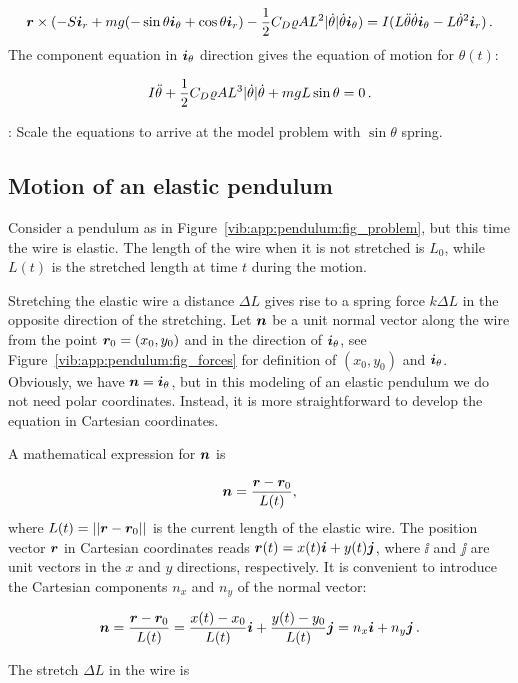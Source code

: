 \documentclass[%
oneside,                 %
final,                   %
10pt]{article}
\newcommand{\shortinlinecomment}[3]{{\color{red}{\bf #1}: #2}}
\begin{document}
\[ \rpos\times(-S\ir + mg(-\sin\theta\ith + \cos\theta\ir) -
\frac{1}{2}C_D\varrho AL^2|\dot\theta|\dot\theta\ith)
= I(L\ddot\theta\dot\theta\ith - L\dot\theta^2\ir)\tp\]
The component equation in $\ith$ direction gives the equation of motion
for $\theta(t)$:

\begin{equation}
I\ddot\theta + \frac{1}{2}C_D\varrho AL^3|\dot\theta|\dot\theta
+ mgL\sin\theta = 0\tp
\label{vib:app:pendulum:thetaeq_physical}
\end{equation}

\shortinlinecomment{hpl 11}{ Scale the equations to arrive at the model problem with $\sin\theta$ spring. }{ Scale the equations to }

\subsection{Motion of an elastic pendulum}
\label{vib:app:pendulum_elastic}

Consider a pendulum as in Figure~\ref{vib:app:pendulum:fig_problem}, but
this time the wire is elastic. The length of the wire when it is not
stretched is $L_0$, while $L(t)$ is the stretched
length at time $t$ during the motion.

Stretching the elastic wire a distance $\Delta L$
gives rise to a spring force $k\Delta L$ in the opposite direction of the
stretching. Let $\normalvec$ be a unit normal vector along the wire
from the point $\rpos_0=(x_0,y_0)$ and in the direction of $\ith$,
see Figure~\ref{vib:app:pendulum:fig_forces} for definition of
$(x_0,y_0)$ and $\ith$. Obviously, we have $\normalvec=\ith$, but in
this modeling of an elastic pendulum we do not need polar coordinates.
Instead, it is more straightforward to develop the equation in
Cartesian coordinates.

A mathematical expression for $\normalvec$ is

\[ \normalvec = \frac{\rpos-\rpos_0}{L(t)},\]
where $L(t)=||\rpos-\rpos_0||$ is the current length of the elastic wire.
The position vector $\rpos$ in Cartesian coordinates reads
$\rpos(t) = x(t)\ii + y(t)\jj$, where $\ii$ and $\jj$ are unit vectors
in the $x$ and $y$ directions, respectively.
It is convenient to introduce the Cartesian components $n_x$ and $n_y$
of the normal vector:

\[ \normalvec = \frac{\rpos-\rpos_0}{L(t)} = \frac{x(t)-x_0}{L(t)}\ii + \frac{y(t)-y_0}{L(t)}\jj = n_x\ii + n_y\jj\tp\]

The stretch $\Delta L$ in the wire is
\end{document}
